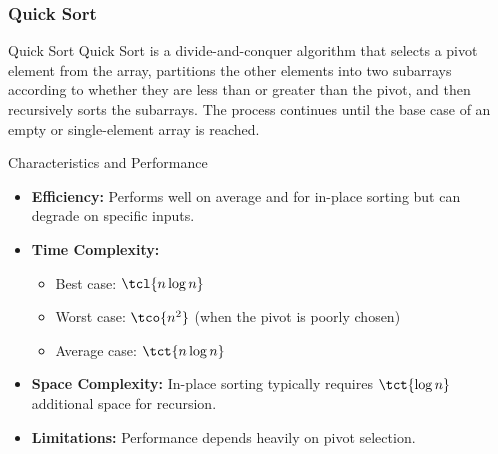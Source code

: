 \newpage
\subsubsection{Quick Sort}
\begin{definition}[]{Quick Sort}
    Quick Sort is a divide-and-conquer algorithm that selects a pivot element from the array, partitions the other elements into two subarrays according to whether they are less than or greater than the pivot, and then recursively sorts the subarrays. The process continues until the base case of an empty or single-element array is reached.
\end{definition}

\begin{properties}[]{Characteristics and Performance}
    \begin{itemize}
        \item \textbf{Efficiency:} Performs well on average and for in-place sorting but can degrade on specific inputs.
        \item \textbf{Time Complexity:}
              \begin{itemize}
                  \item Best case: $\tcl{n \log n}$
                  \item Worst case: $\tco{n^2}$ (when the pivot is poorly chosen)
                  \item Average case: $\tct{n \log n}$
              \end{itemize}
        \item \textbf{Space Complexity:} In-place sorting typically requires $\tct{\log n}$ additional space for recursion.
        \item \textbf{Limitations:} Performance depends heavily on pivot selection.
    \end{itemize}
\end{properties}

